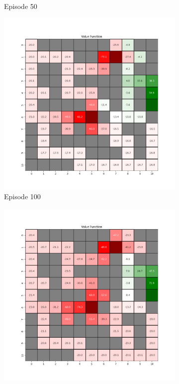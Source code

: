 \documentclass{assignment}
\begin{document}
\begin{figure}[H]
\begin{subfigure}{0.3\textwidth}
    \caption{Episode 50}
    \end{subfigure}\hfill
    \begin{subfigure}{0.3\textwidth}
        \includegraphics[width=\textwidth]{figures/value_td/epsilon_sweep/value_function_alpha_0.1_gamma_0.95_epsilon_0.8_iteration_100.png}
    \caption{Episode 100}
    \end{subfigure}
    \begin{subfigure}{0.3\textwidth}
        \includegraphics[width=\textwidth]{figures/value_td/epsilon_sweep/value_function_alpha_0.1_gamma_0.95_epsilon_0.8_iteration_1000.png}

\end{subfigure}
\end{figure}
\end{document}

